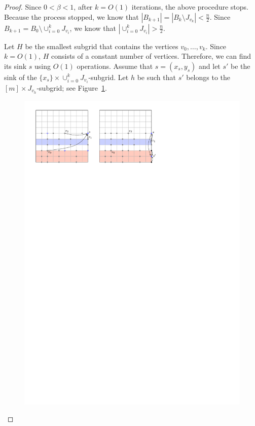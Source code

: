 \documentclass[runningheads,a4paper]{llncs}
\begin{document}
\begin{proof}
Since $0 < \beta < 1$, after $k = O(1)$ iterations, the above procedure stops. 
Because the process stopped, we know that $|B_{k+1}| = |B_k \setminus J_{v_k}| <  \frac{n}{2}$.
Since $B_{k+1} = B_0\setminus \cup_{i=0}^k J_{v_i}$, we know that $|\cup_{i=0}^k J_{v_i}| >  \frac{n}{2}$.

Let $H$ be the smallest subgrid that contains the vertices $v_0, \ldots, v_k$. Since $k = O(1)$, $H$ consists of a constant number of vertices. Therefore, we can find its sink $s$ using $O(1)$ operations. 
Assume that $s = (x_s, y_s)$ and let $s'$ be the sink of the $\{x_s\}\times \cup_{i=0}^k J_{v_i}$-subgrid. 
Let $h$ be such that $s'$ belongs to the $[m]\times J_{v_h}$-subgrid; see Figure~\ref{fig:Climbing Lemma-2}.

\begin{figure}[h]
\centering
\includegraphics[width=1\textwidth]{ClimbingLemma-2.pdf}
\caption{\small }
\label{fig:Climbing Lemma-2}
\end{figure}


\end{proof}
\end{document}

